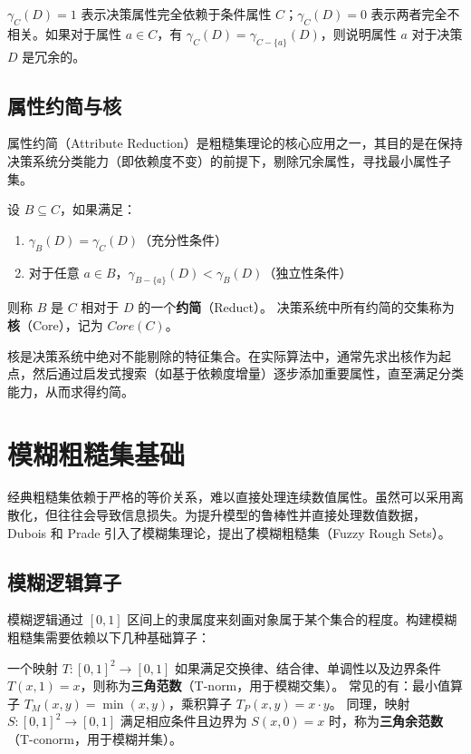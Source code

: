 \(\gamma_C(D) = 1\) 表示决策属性完全依赖于条件属性 \(C\)；\(\gamma_C(D) = 0\) 表示两者完全不相关。如果对于属性 \(a \in C\)，有 \(\gamma_{C}(D) = \gamma_{C-\{a\}}(D)\)，则说明属性 \(a\) 对于决策 \(D\) 是冗余的。

\subsection{属性约简与核}

属性约简（Attribute Reduction）是粗糙集理论的核心应用之一，其目的是在保持决策系统分类能力（即依赖度不变）的前提下，剔除冗余属性，寻找最小属性子集。

\begin{definition}[属性约简与核]
	设 \(B \subseteq C\)，如果满足：
	\begin{enumerate}
		\item \(\gamma_B(D) = \gamma_C(D)\)（充分性条件）
		\item 对于任意 \(a \in B\)，\(\gamma_{B-\{a\}}(D) < \gamma_B(D)\)（独立性条件）
	\end{enumerate}
	则称 \(B\) 是 \(C\) 相对于 \(D\) 的一个\textbf{约简}（Reduct）。
	决策系统中所有约简的交集称为\textbf{核}（Core），记为 \(Core(C)\)。
\end{definition}
核是决策系统中绝对不能剔除的特征集合。在实际算法中，通常先求出核作为起点，然后通过启发式搜索（如基于依赖度增量）逐步添加重要属性，直至满足分类能力，从而求得约简。

\section{模糊粗糙集基础}

经典粗糙集依赖于严格的等价关系，难以直接处理连续数值属性。虽然可以采用离散化，但往往会导致信息损失。为提升模型的鲁棒性并直接处理数值数据，Dubois 和 Prade 引入了模糊集理论，提出了模糊粗糙集（Fuzzy Rough Sets）。

\subsection{模糊逻辑算子}
模糊逻辑通过 \([0, 1]\) 区间上的隶属度来刻画对象属于某个集合的程度。构建模糊粗糙集需要依赖以下几种基础算子：

\begin{definition}[三角范数与三角余范数]
	一个映射 \(T: [0,1]^2 \to [0,1]\) 如果满足交换律、结合律、单调性以及边界条件 \(T(x,1)=x\)，则称为\textbf{三角范数}（T-norm，用于模糊交集）。
	常见的有：最小值算子 \(T_M(x,y) = \min(x,y)\)，乘积算子 \(T_P(x,y) = x \cdot y\)。
	同理，映射 \(S: [0,1]^2 \to [0,1]\) 满足相应条件且边界为 \(S(x,0)=x\) 时，称为\textbf{三角余范数}（T-conorm，用于模糊并集）。
\end{definition}

